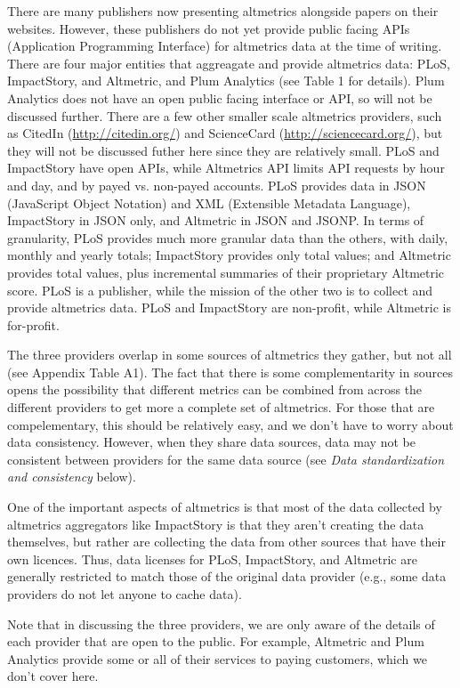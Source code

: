 \documentclass[letterpaper,superscriptaddress,showkeys,longbibliography]{revtex4-1}\usepackage{graphicx, color}
\begin{document}
There are many publishers now presenting altmetrics alongside papers on their websites. However, these publishers do not yet provide public facing APIs (Application Programming Interface) for altmetrics data at the time of writing. There are four major entities that aggreagate and provide altmetrics data: PLoS, ImpactStory, and Altmetric, and Plum Analytics (see Table 1 for details). Plum Analytics does not have an open public facing interface or API, so will not be discussed further. There are a few other smaller scale altmetrics providers, such as CitedIn (\url{http://citedin.org/}) and ScienceCard (\url{http://sciencecard.org/}), but they will not be discussed futher here since they are relatively small. PLoS and ImpactStory have open APIs, while Altmetrics API limits API requests by hour and day, and by payed vs. non-payed accounts. PLoS provides data in JSON (JavaScript Object Notation) and XML (Extensible Metadata Language), ImpactStory in JSON only, and Altmetric in JSON and JSONP. In terms of granularity, PLoS provides much more granular data than the others, with daily, monthly and yearly totals; ImpactStory provides only total values; and Altmetric provides total values, plus incremental summaries of their proprietary Altmetric score. PLoS is a publisher, while the mission of the other two is to collect and provide altmetrics data. PLoS and ImpactStory are non-profit, while Altmetric is for-profit.

The three providers overlap in some sources of altmetrics they gather, but not all (see Appendix Table A1). The fact that there is some complementarity in sources opens the possibility that different metrics can be combined from across the different providers to get more a complete set of altmetrics. For those that are compelementary, this should be relatively easy, and we don't have to worry about data consistency. However, when they share data sources, data may not be consistent between providers for the same data source (see \emph{Data standardization and consistency} below).

One of the important aspects of altmetrics is that most of the data collected by altmetrics aggregators like ImpactStory is that they aren't creating the data themselves, but rather are collecting the data from other sources that have their own licences. Thus, data licenses for PLoS, ImpactStory, and Altmetric are generally restricted to match those of the original data provider (e.g., some data providers do not let anyone to cache data). 

Note that in discussing the three providers, we are only aware of the details of each provider that are open to the public. For example, Altmetric and Plum Analytics provide some or all of their services to paying customers, which we don't cover here. 
\end{document}
